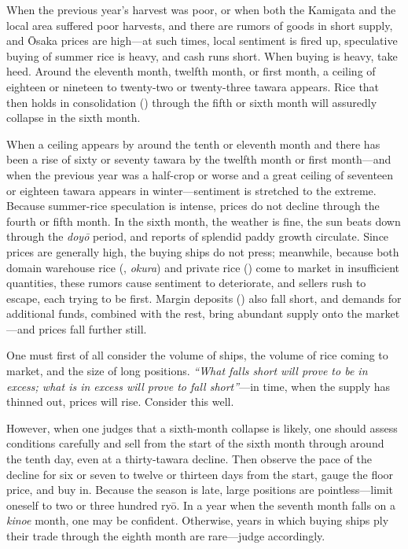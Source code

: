 
\begin{sokyubox}
{\small\itshape\color{sokyubar} }

\medskip
When the previous year's harvest was poor, or when both the Kamigata and
the local area suffered poor harvests, and there are rumors of goods in
short supply, and \=Osaka prices are high---at such times, local
sentiment is fired up, speculative buying of summer rice is heavy, and
cash runs short. When buying is heavy, take heed. Around the eleventh
month, twelfth month, or first month, a ceiling of eighteen or nineteen
to twenty-two or twenty-three tawara appears. Rice that then holds in
consolidation () through the fifth or sixth month will
assuredly collapse in the sixth month.

When a ceiling appears by around the tenth or eleventh month and there
has been a rise of sixty or seventy tawara by the twelfth month or first
month---and when the previous year was a half-crop or worse and a great
ceiling of seventeen or eighteen tawara appears in winter---sentiment is
stretched to the extreme. Because summer-rice speculation is intense,
prices do not decline through the fourth or fifth month. In the sixth
month, the weather is fine, the sun beats down through the \textit{doy\=o}
period, and reports of splendid paddy growth circulate. Since prices are
generally high, the buying ships do not press; meanwhile, because both
domain warehouse rice (, \textit{okura}) and private rice
() come to market in insufficient quantities, these
rumors cause sentiment to deteriorate, and sellers rush to escape, each
trying to be first. Margin deposits () also fall
short, and demands for additional funds, combined with the rest, bring
abundant supply onto the market---and prices fall further still.

One must first of all consider the volume of ships, the volume of rice
coming to market, and the size of long positions. \textit{``What falls
short will prove to be in excess; what is in excess will prove to fall
short''}---in time, when the supply has thinned out, prices will rise.
Consider this well.

However, when one judges that a sixth-month collapse is likely, one
should assess conditions carefully and sell from the start of the sixth
month through around the tenth day, even at a thirty-tawara decline.
Then observe the pace of the decline for six or seven to twelve or
thirteen days from the start, gauge the floor price, and buy in. Because
the season is late, large positions are pointless---limit oneself to two
or three hundred ry\=o. In a year when the seventh month falls on a
\textit{kinoe} month, one may be confident. Otherwise, years in which
buying ships ply their trade through the eighth month are rare---judge
accordingly.
\end{sokyubox}


